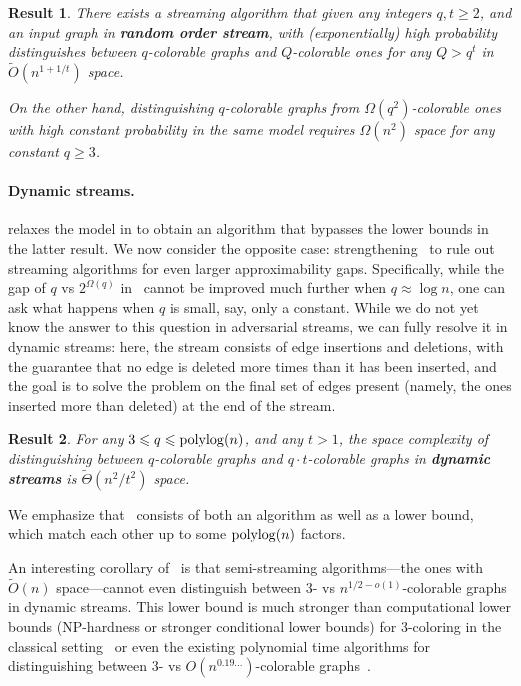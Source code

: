 \documentclass[11pt]{article}
\newtheorem{mdresult}{Result}
\newenvironment{result}{\begin{mdframed}[backgroundcolor=lightgray!40,topline=false,rightline=false,leftline=false,bottomline=false,innertopmargin=5pt]\begin{mdresult}}{\end{mdresult}\end{mdframed}}
\theoremstyle{definition}
\renewcommand{\leq}{\leqslant}
\renewcommand{\geq}{\geqslant}
\newcommand{\Ot}{\ensuremath{\widetilde{O}}}
\newcommand{\poly}{\mbox{\rm poly}}
\begin{document}
\begin{result}\label{res:rand}
	There exists a streaming algorithm that given any integers $q,t  \geq 2$, and an input graph in \textbf{random order stream}, with (exponentially) high probability distinguishes between $q$-colorable graphs and $Q$-colorable ones for any $Q > q^t$ in $\Ot(n^{1+1/t})$ space. 
	
	On the other hand, distinguishing $q$-colorable graphs from $\Omega(q^2)$-colorable ones with high constant probability in the same model requires $\Omega(n^2)$ space
	for any {constant} $q \geq 3$. 
\end{result}

\paragraph{Dynamic streams.}  relaxes the model in  to obtain an algorithm that bypasses the lower bounds in the latter result. 
We now consider the opposite case: strengthening~ to rule out streaming algorithms for even larger approximability gaps. Specifically, 
while the gap of $q$ vs $2^{\Omega(q)}$ in~ cannot be improved much further when $q \approx \log{n}$, one can ask what happens when $q$ is small, say, only a constant. 
While we do not yet know the answer to this question in adversarial streams, we can fully resolve it in dynamic streams: here, the stream consists of edge insertions and deletions, with the guarantee 
that no edge is deleted more times than it has been inserted, and the goal is to solve the problem on the final set of edges present (namely, the ones inserted more than deleted) at the end of the stream. 

\begin{result}\label{res:dynamic}
	For any $3 \leq q \leq \poly\!\log{\!(n)}$, and any $t > 1$, the space complexity of distinguishing between $q$-colorable graphs and $q\cdot t$-colorable graphs	in \textbf{dynamic streams} is $\widetilde{\Theta}(n^2/t^2)$ space. 
\end{result}

We emphasize that~ consists of both an algorithm as well as a lower bound, which match each other up to some $\poly\!\log\!{(n)}$ factors. 

An interesting corollary of~ is that
semi-streaming algorithms---the ones with $\Ot(n)$ space---cannot even
distinguish between 3- vs $n^{1/2-o(1)}$-colorable graphs in dynamic streams. This lower bound is much stronger than 
computational lower bounds (NP-hardness or stronger conditional lower bounds) for $3$-coloring in the classical setting~\cite{DinurMR06} or even the existing polynomial time
algorithms for distinguishing between 3- vs $O(n^{0.19...})$-colorable graphs~\cite{KawarabayashiTY24,KawarabayashiT17}. 
\end{document}
